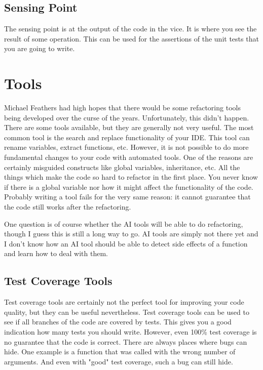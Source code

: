 \subsection{Sensing Point}

The sensing point is at the output of the code in the vice. It is where you see the result of some operation. This can be used for the assertions of the unit tests that you are going to write.




\section{Tools}

Michael Feathers had high hopes that there would be some refactoring tools being developed over the curse of the years. Unfortunately, this didn't happen. There are some tools available, but they are generally not very useful. The most common tool is the search and replace functionality of your IDE. This tool can rename variables, extract functions, etc. However, it is not possible to do more fundamental changes to your code with automated tools. One of the reasons are certainly misguided constructs like global variables, inheritance, etc. All the things which make the code so hard to refactor in the first place. You never know if there is a global variable nor how it might affect the functionality of the code. Probably writing a tool fails for the very same reason: it cannot guarantee that the code still works after the refactoring.

One question is of course whether the AI tools will be able to do refactoring, though I guess this is still a long way to go. AI tools are simply not there yet and I don't know how an AI tool should be able to detect side effects of a function and learn how to deal with them.

\subsection{Test Coverage Tools}

Test coverage tools are certainly not the perfect tool for improving your code quality, but they can be useful nevertheless. Test coverage tools can be used to see if all branches of the code are covered by tests. This gives you a good indication how many tests you should write. However, even 100\% test coverage is no guarantee that the code is correct. There are always places where bugs can hide. One example is a function that was called with the wrong number of arguments. And even with "good" test coverage, such a bug can still hide.

